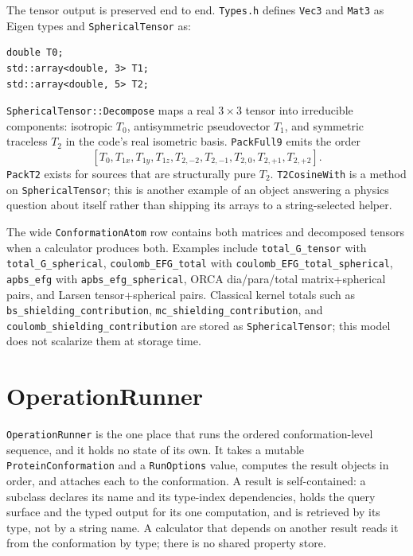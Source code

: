 \documentclass[11pt]{article}
\newcommand{\code}[1]{\texttt{#1}}
\begin{document}
The tensor output is preserved end to end. \code{Types.h} defines
\code{Vec3} and \code{Mat3} as Eigen types and \code{SphericalTensor} as:

\begin{lstlisting}
double T0;
std::array<double, 3> T1;
std::array<double, 5> T2;
\end{lstlisting}

\code{SphericalTensor::Decompose} maps a real \(3\times3\) tensor into
irreducible components: isotropic \(T_0\), antisymmetric pseudovector \(T_1\),
and symmetric traceless \(T_2\) in the code's real isometric basis.
\code{PackFull9} emits the order
\[
  [T_0, T_{1x}, T_{1y}, T_{1z},
    T_{2,-2}, T_{2,-1}, T_{2,0}, T_{2,+1}, T_{2,+2}].
\]
\code{PackT2} exists for sources that are structurally pure \(T_2\).
\code{T2CosineWith} is a method on \code{SphericalTensor}; this is another
example of an object answering a physics question about itself rather than
shipping its arrays to a string-selected helper.

The wide \code{ConformationAtom} row contains both matrices and decomposed
tensors when a calculator produces both. Examples include
\code{total\_G\_tensor} with \code{total\_G\_spherical},
\code{coulomb\_EFG\_total} with
\code{coulomb\_EFG\_total\_spherical}, \code{apbs\_efg} with
\code{apbs\_efg\_spherical}, ORCA dia/para/total matrix+spherical pairs,
and Larsen tensor+spherical pairs. Classical kernel totals such as
\code{bs\_shielding\_contribution},
\code{mc\_shielding\_contribution}, and
\code{coulomb\_shielding\_contribution} are stored as
\code{SphericalTensor}; this model does not scalarize them at storage time.

\section{OperationRunner}

\code{OperationRunner} is the one place that runs the ordered conformation-level
sequence, and it holds no state of its own. It takes a mutable \code{ProteinConformation}
and a \code{RunOptions} value, computes the result objects in order, and attaches each to
the conformation. A result is self-contained: a subclass declares its name and its
type-index dependencies, holds the query surface and the typed output for its one
computation, and is retrieved by its type, not by a string name. A calculator that
depends on another result reads it from the conformation by type; there is no shared
property store.
\end{document}

